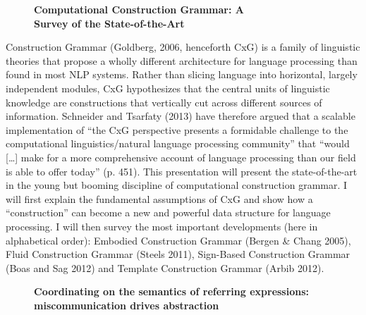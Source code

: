 \documentclass[10pt, a4paper, twopage, headinclude, footinclude, BCOR5mm]{book}
\begin{document}
\begin{figure}[t!]
\centering
\large\textbf{Computational Construction Grammar: A \\ Survey of the State-of-the-Art}
\vspace*{0.5cm}
\end{figure}


\begin{table}[t!]
\end{table} 
\noindent
Construction Grammar (Goldberg, 2006, henceforth CxG) is a family of linguistic theories that propose a wholly different architecture for language processing than found in most NLP systems. Rather than slicing language into horizontal, largely independent modules, CxG hypothesizes that the central units of linguistic knowledge are constructions that vertically cut across different sources of information. Schneider and Tsarfaty (2013) have therefore argued that a scalable implementation of “the CxG perspective presents a formidable challenge to the computational linguistics/natural language processing community” that “would […] make for a more comprehensive account of language processing than our field is able to offer today” (p. 451).  This presentation will present the state-of-the-art in the young but booming discipline of computational construction grammar. I will first explain the fundamental assumptions of CxG and show how a “construction” can become a new and powerful data structure for language processing. I will then survey the most important developments (here in alphabetical order): Embodied Construction Grammar (Bergen \& Chang 2005), Fluid Construction Grammar (Steels 2011), Sign-Based Construction Grammar (Boas and Sag 2012) and Template Construction Grammar (Arbib 2012).   

\newpage

\begin{figure}[t!]
\centering
\large\textbf{Coordinating on the semantics of referring expressions: \\ miscommunication drives abstraction}
\vspace*{0.5cm}
\end{figure}
\end{document}
